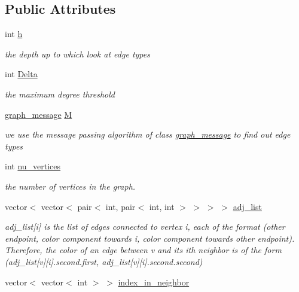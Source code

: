 \subsection*{Public Attributes}
\begin{DoxyCompactItemize}
\item 
int \hyperlink{classcolored__graph_ae27062a4ee59df2670d3a0c81e85a3fa}{h}
\begin{DoxyCompactList}\small\item\em the depth up to which look at edge types \end{DoxyCompactList}\item 
int \hyperlink{classcolored__graph_a5b0e93eb40a20dc815c809dee11edc12}{Delta}
\begin{DoxyCompactList}\small\item\em the maximum degree threshold \end{DoxyCompactList}\item 
\hyperlink{classgraph__message}{graph\+\_\+message} \hyperlink{classcolored__graph_ab72c568fe12f7c849ca6bffb145aec47}{M}
\begin{DoxyCompactList}\small\item\em we use the message passing algorithm of class \hyperlink{classgraph__message}{graph\+\_\+message} to find out edge types \end{DoxyCompactList}\item 
int \hyperlink{classcolored__graph_a90ece8eb1fec52f3f41549ab527c1d5b}{nu\+\_\+vertices}
\begin{DoxyCompactList}\small\item\em the number of vertices in the graph. \end{DoxyCompactList}\item 
vector$<$ vector$<$ pair$<$ int, pair$<$ int, int $>$ $>$ $>$ $>$ \hyperlink{classcolored__graph_a45dce16965079286cf3f41a54a1b2ea4}{adj\+\_\+list}
\begin{DoxyCompactList}\small\item\em adj\+\_\+list\mbox{[}i\mbox{]} is the list of edges connected to vertex i, each of the format (other endpoint, color component towards i, color component towards other endpoint). Therefore, the color of an edge between v and its ith neighbor is of the form (adj\+\_\+list\mbox{[}v\mbox{]}\mbox{[}i\mbox{]}.second.\+first, adj\+\_\+list\mbox{[}v\mbox{]}\mbox{[}i\mbox{]}.second.\+second) \end{DoxyCompactList}\item 
vector$<$ vector$<$ int $>$ $>$ \hyperlink{classcolored__graph_ae28fcd089f9785204d76b6a608bed54f}{index\+\_\+in\+\_\+neighbor}

\end{DoxyCompactItemize}
